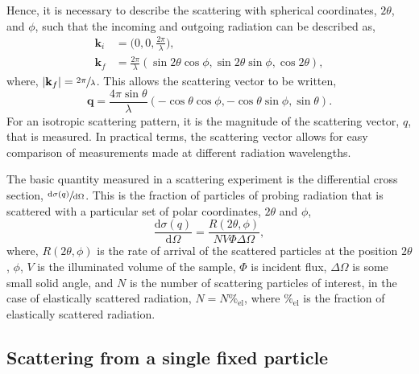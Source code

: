 Hence, it is necessary to describe the scattering with spherical coordinates, $2\theta$, and $\phi$, such that the incoming and outgoing radiation can be described as,
%
\begin{equation}
    \begin{aligned}
        \mathbf{k}_i & = \bigg(0, 0, \frac{2\pi}{\lambda}\bigg), \\
        \mathbf{k}_f & = \frac{2\pi}{\lambda}(\sin{2\theta}\cos{\phi}, \sin{2\theta}\sin{\phi}, \cos{2\theta}),
    \end{aligned}
\end{equation}
%
where, $|\mathbf{k}_f| = \sfrac{2\pi}{\lambda}$. This allows the scattering vector to be written,
%
\begin{equation}
    \mathbf{q} = \frac{4\pi\sin{\theta}}{\lambda}(-\cos{\theta}\cos{\phi}, -\cos{\theta}\sin{\phi},\sin{\theta}).
\end{equation}
%
For an isotropic scattering pattern, it is the magnitude of the scattering vector, $q$, that is measured.
In practical terms, the scattering vector allows for easy comparison of measurements made at different radiation wavelengths.

The basic quantity measured in a scattering experiment is the differential cross section, $\sfrac{\text{d}\sigma(q)}{\text{d}\Omega}$.
This is the fraction of particles of probing radiation that is scattered with a particular set of polar coordinates, $2\theta$ and $\phi$,
%
\begin{equation}
    \frac{\text{d}\sigma(q)}{\text{d}\Omega} = \frac{R(2\theta,\phi)}{NV\Phi\Delta \Omega},
    \label{equ:dsc}
\end{equation}
%
where, $R(2\theta,\phi)$ is the rate of arrival of the scattered particles at the position $2\theta$, $\phi$, $V$ is the illuminated volume of the sample, $\Phi$ is incident flux, $\Delta \Omega$ is some small solid angle, and $N$ is the number of scattering particles of interest, in the case of elastically scattered radiation, $N = N\%_{\text{el}}$, where $\%_{\text{el}}$ is the fraction of elastically scattered radiation.

\subsection{Scattering from a single fixed particle}

